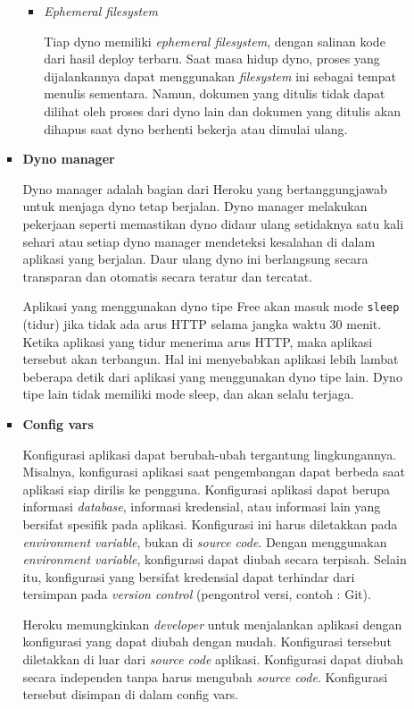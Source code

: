 \documentclass[a4paper,twoside]{article}
\begin{document}
\begin{enumerate}
\begin{enumerate}
\begin{itemize}
\begin{itemize}
\item \textit{Ephemeral filesystem}

Tiap dyno memiliki \textit{ephemeral filesystem}, dengan salinan kode dari hasil deploy terbaru. Saat masa hidup dyno, proses yang dijalankannya dapat menggunakan \textit{filesystem} ini sebagai tempat menulis sementara. Namun, dokumen yang ditulis tidak dapat dilihat oleh proses dari dyno lain dan dokumen yang ditulis akan dihapus saat dyno berhenti bekerja atau dimulai ulang.

\end{itemize}
		
				\item \textbf{Dyno manager}
		
				Dyno manager adalah bagian dari Heroku yang bertanggungjawab untuk menjaga dyno tetap berjalan. Dyno manager melakukan pekerjaan seperti memastikan dyno didaur ulang setidaknya satu kali sehari atau setiap dyno manager mendeteksi kesalahan di dalam aplikasi yang berjalan. Daur ulang dyno ini berlangsung secara transparan dan otomatis secara teratur dan tercatat.

Aplikasi yang menggunakan dyno tipe Free akan masuk mode \texttt{sleep} (tidur) jika tidak ada arus HTTP selama jangka waktu 30 menit. Ketika aplikasi yang tidur menerima arus HTTP, maka aplikasi tersebut akan terbangun. Hal ini menyebabkan aplikasi lebih lambat beberapa detik dari aplikasi yang menggunakan dyno tipe lain. Dyno tipe lain tidak memiliki mode sleep, dan akan selalu terjaga.
		
				\item \textbf{Config vars}
		
				Konfigurasi aplikasi dapat berubah-ubah tergantung lingkungannya. Misalnya, konfigurasi aplikasi saat pengembangan dapat berbeda saat aplikasi siap dirilis ke pengguna. Konfigurasi aplikasi dapat berupa informasi \textit{database}, informasi kredensial, atau informasi lain yang bersifat spesifik pada aplikasi. Konfigurasi ini harus diletakkan pada \textit{environment variable}, bukan di \textit{source code}. Dengan menggunakan \textit{environment variable}, konfigurasi dapat diubah secara terpisah. Selain itu, konfigurasi yang bersifat kredensial dapat terhindar dari tersimpan pada \textit{version control} (pengontrol versi, contoh : Git).

Heroku memungkinkan \textit{developer} untuk menjalankan aplikasi dengan konfigurasi yang dapat diubah dengan mudah. Konfigurasi tersebut diletakkan di luar dari \textit{source code} aplikasi. Konfigurasi dapat diubah secara independen tanpa harus mengubah \textit{source code}. Konfigurasi tersebut disimpan di dalam config vars.


\end{itemize}
\end{enumerate}
\end{enumerate}
\end{document}
